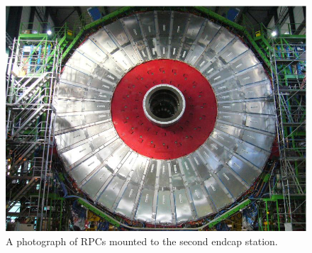 \begin{figure}[H]
    \centering
    \includegraphics[width=1\textwidth]{Images/CMS/RE.png}
    \caption{A photograph of RPCs mounted to the second endcap station.}
    \label{fig:RPC}
\end{figure}
